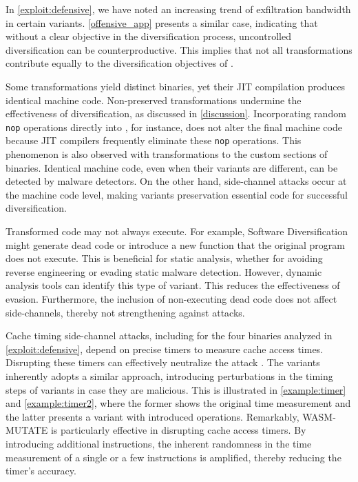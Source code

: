 \label{exploit:discussion}
In \autoref{exploit:defensive}, we have noted an increasing trend of exfiltration bandwidth in certain variants. 
\autoref{offensive_app} presents a similar case, indicating that without a clear objective in the diversification process, uncontrolled diversification can be counterproductive. 
This implies that not all transformations contribute equally to the diversification objectives of \Wasm.


Some transformations yield distinct \Wasm binaries, yet their JIT compilation produces identical machine code.
Non-preserved transformations undermine the effectiveness of diversification, as discussed in \autoref{discussion}.
Incorporating random \texttt{nop} operations directly into \Wasm, for instance, does not alter the final machine code because JIT compilers frequently eliminate these \texttt{nop} operations.
This phenomenon is also observed with transformations to the custom sections of \Wasm binaries.
Identical machine code, even when their \Wasm variants are different, can be detected by malware detectors.
On the other hand, side-channel attacks occur at the machine code level, making \Wasm variants preservation essential code for successful diversification.


Transformed code may not always execute. 
For example, Software Diversification might generate dead code or introduce a new function that the original program does not execute. 
This is beneficial for static analysis, whether for avoiding reverse engineering or evading static malware detection. 
However, dynamic analysis tools can identify this type of variant. 
This reduces the effectiveness of evasion. 
Furthermore, the inclusion of non-executing dead code does not affect side-channels, thereby not strengthening against attacks.
 
 Cache timing side-channel attacks, including for the four binaries analyzed in \autoref{exploit:defensive}, depend on precise timers to measure cache access times. 
Disrupting these timers can effectively neutralize the attack \cite{JStimers}. 
The \Wasm variants inherently adopts a similar approach, introducing perturbations in the timing steps of \Wasm variants in case they are malicious. 
This is illustrated in \autoref{example:timer} and \autoref{example:timer2}, where the former shows the original time measurement and the latter presents a variant with introduced operations.
Remarkably, WASM-MUTATE is particularly effective in disrupting cache access timers. 
By introducing additional instructions, the inherent randomness in the time measurement of a single or a few instructions is amplified, thereby reducing the timer's accuracy. 

